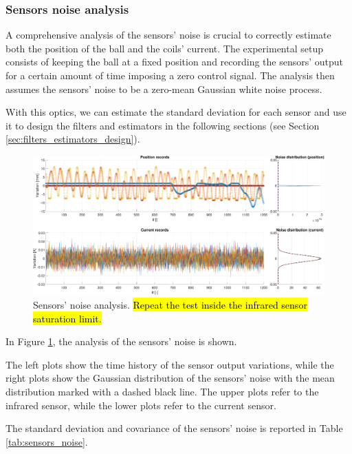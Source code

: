 \subsubsection{Sensors noise analysis}
\label{subsubsec:sensors_noise}

A comprehensive analysis of the sensors' noise is crucial to correctly estimate both the position of the ball and the coils' current.
The experimental setup consists of keeping the ball at a fixed position and recording the sensors' output for a certain amount of time imposing a zero control signal.
The analysis then assumes the sensors' noise to be a zero-mean Gaussian white noise process.

With this optics, we can estimate the standard deviation for each sensor and use it to design the filters and estimators in the following sections (see Section \ref{sec:filters_estimators_design}).

\begin{figure}[H]
    \centering
    \includegraphics[width=1\textwidth]{img/MATLAB/identification/sensor_noises.pdf}
    \caption{Sensors' noise analysis. \hl{Repeat the test inside the infrared sensor saturation limit.}}
    \label{fig:sensors_noise}
\end{figure}

In Figure \ref{fig:sensors_noise}, the analysis of the sensors' noise is shown.

The left plots show the time history of the sensor output variations, while the right plots show the Gaussian distribution of the sensors' noise with the mean distribution marked with a dashed black line.
The upper plots refer to the infrared sensor, while the lower plots refer to the current sensor.

The standard deviation and covariance of the sensors' noise is reported in Table \ref{tab:sensors_noise}.

